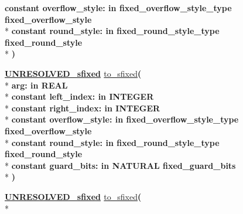 \begin{DoxyCompactItemize}
{\bfseries {\bfseries \textcolor{keywordflow}{constant}\textcolor{vhdlchar}{ }}\textcolor{vhdlchar}{overflow\+\_\+style\+: }\textcolor{stringliteral}{in }\textcolor{vhdlchar}{fixed\+\_\+overflow\+\_\+style\+\_\+type     fixed\+\_\+overflow\+\_\+style}}\\*
{\bfseries {\bfseries \textcolor{keywordflow}{constant}\textcolor{vhdlchar}{ }}\textcolor{vhdlchar}{round\+\_\+style\+: }\textcolor{stringliteral}{in }\textcolor{vhdlchar}{fixed\+\_\+round\+\_\+style\+\_\+type     fixed\+\_\+round\+\_\+style}}\\*
{\bfseries  )} 
\item 
{\bfseries {\bfseries {\bfseries \hyperlink{classfixed__pkg_aa723b28a027c3c0f9bca02d75e8df4d6}{U\+N\+R\+E\+S\+O\+L\+V\+E\+D\+\_\+sfixed}} \textcolor{vhdlchar}{ }}} \hyperlink{classfixed__pkg_ac9269a406e86f4b7816e2e357d628649}{to\+\_\+sfixed}{\bfseries  ( }\\*
{\bfseries \textcolor{vhdlchar}{arg\+: }\textcolor{stringliteral}{in }{\bfseries \textcolor{comment}{R\+E\+A\+L}\textcolor{vhdlchar}{ }}}\\*
{\bfseries {\bfseries \textcolor{keywordflow}{constant}\textcolor{vhdlchar}{ }}\textcolor{vhdlchar}{left\+\_\+index\+: }\textcolor{stringliteral}{in }{\bfseries \textcolor{comment}{I\+N\+T\+E\+G\+E\+R}\textcolor{vhdlchar}{ }}}\\*
{\bfseries {\bfseries \textcolor{keywordflow}{constant}\textcolor{vhdlchar}{ }}\textcolor{vhdlchar}{right\+\_\+index\+: }\textcolor{stringliteral}{in }{\bfseries \textcolor{comment}{I\+N\+T\+E\+G\+E\+R}\textcolor{vhdlchar}{ }}}\\*
{\bfseries {\bfseries \textcolor{keywordflow}{constant}\textcolor{vhdlchar}{ }}\textcolor{vhdlchar}{overflow\+\_\+style\+: }\textcolor{stringliteral}{in }\textcolor{vhdlchar}{fixed\+\_\+overflow\+\_\+style\+\_\+type     fixed\+\_\+overflow\+\_\+style}}\\*
{\bfseries {\bfseries \textcolor{keywordflow}{constant}\textcolor{vhdlchar}{ }}\textcolor{vhdlchar}{round\+\_\+style\+: }\textcolor{stringliteral}{in }\textcolor{vhdlchar}{fixed\+\_\+round\+\_\+style\+\_\+type     fixed\+\_\+round\+\_\+style}}\\*
{\bfseries {\bfseries \textcolor{keywordflow}{constant}\textcolor{vhdlchar}{ }}\textcolor{vhdlchar}{guard\+\_\+bits\+: }\textcolor{stringliteral}{in }\textcolor{vhdlchar}{N\+A\+T\+U\+R\+A\+L     fixed\+\_\+guard\+\_\+bits}}\\*
{\bfseries  )} 
\item 
{\bfseries {\bfseries {\bfseries \hyperlink{classfixed__pkg_aa723b28a027c3c0f9bca02d75e8df4d6}{U\+N\+R\+E\+S\+O\+L\+V\+E\+D\+\_\+sfixed}} \textcolor{vhdlchar}{ }}} \hyperlink{classfixed__pkg_abbbd2a0b519a9fd9b21058a114a7864c}{to\+\_\+sfixed}{\bfseries  ( }\\*

\end{DoxyCompactItemize}
